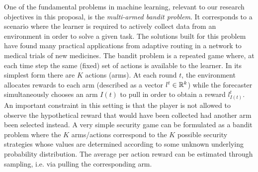 One of the fundamental problems in machine learning, relevant to our research objectives in this proposal, is the \textit{multi-armed bandit problem}. It corresponds to a scenario where the learner is required to actively collect data from an environment in order to solve a given task. The solutions built for this problem have found many practical applications from adaptive routing in a network to medical trials of new medicines\cite{bubeck2012regret}.  
The bandit problem is a repeated game where, at each time step the same (fixed) set of actions is available to the learner. 
In its simplest form there are $K$ actions (arms). At each round $t$, the environment allocates rewards to each arm (described as a vector $l^t\in\mathbb{R}^k$) while the forecaster simultaneously chooses an arm $I(t)$ to pull in order to obtain a reward $l^t_{I(t)}$. An important constraint in this setting is that the player is not allowed to observe the hypothetical reward that would have been collected had another arm been selected instead.
A very simple security game can be formulated as a bandit problem where the $K$ arms/actions correspond to the $K$ possible security strategies whose values are determined according to some unknown underlying probability distribution. 
The average per action reward can be estimated through sampling, i.e. via pulling the corresponding arm. 
  




